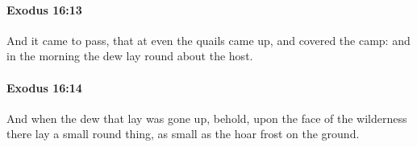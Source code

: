 		\paragraph{Exodus 16:13} %
			\label{EXODUS-16-13}

			And it came to pass, that at even the quails came up, and covered the camp: and in the morning the dew lay round about the host.


		\paragraph{Exodus 16:14} %
			\label{EXODUS-16-14}

			And when the dew that lay was gone up, behold, upon the face of the wilderness there lay a small round thing, as small as the hoar frost on the ground.


